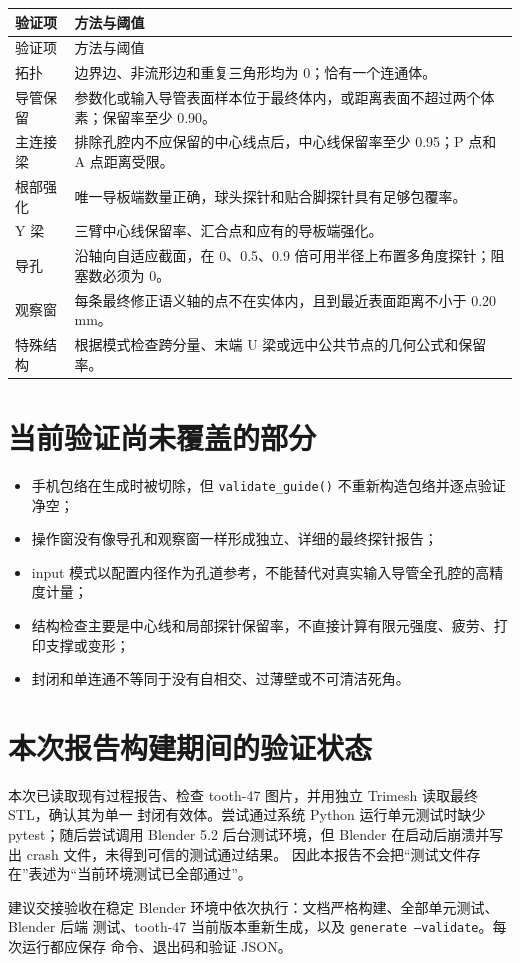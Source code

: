 \begin{longtable}{p{}p{}}
  \toprule
  验证项 & 方法与阈值\\
  \midrule
  \endfirsthead
  \toprule
  验证项 & 方法与阈值\\
  \midrule
  \endhead
  拓扑 & 边界边、非流形边和重复三角形均为 0；恰有一个连通体。\\
  导管保留 & 参数化或输入导管表面样本位于最终体内，或距离表面不超过两个体素；保留率至少 0.90。\\
  主连接梁 & 排除孔腔内不应保留的中心线点后，中心线保留率至少 0.95；P 点和 A 点距离受限。\\
  根部强化 & 唯一导板端数量正确，球头探针和贴合脚探针具有足够包覆率。\\
  Y 梁 & 三臂中心线保留率、汇合点和应有的导板端强化。\\
  导孔 & 沿轴向自适应截面，在 0、0.5、0.9 倍可用半径上布置多角度探针；阻塞数必须为 0。\\
  观察窗 & 每条最终修正语义轴的点不在实体内，且到最近表面距离不小于 0.20 mm。\\
  特殊结构 & 根据模式检查跨分量、末端 U 梁或远中公共节点的几何公式和保留率。\\
  \bottomrule
\end{longtable}

\section{当前验证尚未覆盖的部分}

\begin{itemize}
  \item 手机包络在生成时被切除，但 \texttt{validate\_guide()} 不重新构造包络并逐点验证净空；
  \item 操作窗没有像导孔和观察窗一样形成独立、详细的最终探针报告；
  \item input 模式以配置内径作为孔道参考，不能替代对真实输入导管全孔腔的高精度计量；
  \item 结构检查主要是中心线和局部探针保留率，不直接计算有限元强度、疲劳、打印支撑或变形；
  \item 封闭和单连通不等同于没有自相交、过薄壁或不可清洁死角。
\end{itemize}

\section{本次报告构建期间的验证状态}

本次已读取现有过程报告、检查 tooth-47 图片，并用独立 Trimesh 读取最终 STL，确认其为单一
封闭有效体。尝试通过系统 Python 运行单元测试时缺少 pytest；随后尝试调用 Blender 5.2
后台测试环境，但 Blender 在启动后崩溃并写出 crash 文件，未得到可信的测试通过结果。
因此本报告不会把“测试文件存在”表述为“当前环境测试已全部通过”。

建议交接验收在稳定 Blender 环境中依次执行：文档严格构建、全部单元测试、Blender 后端
测试、tooth-47 当前版本重新生成，以及 \texttt{generate --validate}。每次运行都应保存
命令、退出码和验证 JSON。

